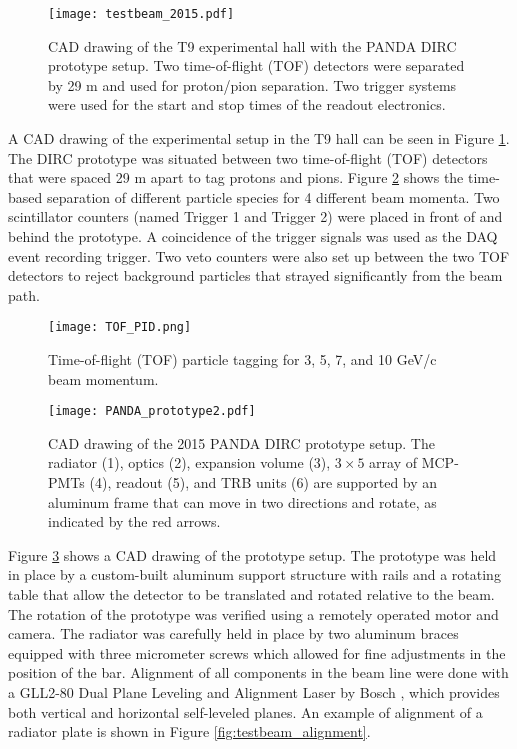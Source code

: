 \begin{figure}[!htb]
	\centering
	\texttt{[image: testbeam\_2015.pdf]}
	\caption{CAD drawing of the T9 experimental hall with the PANDA DIRC prototype setup. Two time-of-flight (TOF) detectors were separated by 29 m and used for proton/pion separation. Two trigger systems were used for the start and stop times of the readout electronics.}
	\label{fig:testbeam_2015}
\end{figure}

A CAD drawing of the experimental setup in the T9 hall can be seen in Figure \ref{fig:testbeam_2015}. The DIRC prototype was situated between two time-of-flight (TOF) detectors that were spaced 29 m apart to tag protons and pions. Figure \ref{fig:TOF_PID} shows the time-based separation of different particle species for 4 different beam momenta. Two scintillator counters (named Trigger 1 and Trigger 2) were placed in front of and behind the prototype. A coincidence of the trigger signals was used as the DAQ event recording trigger. Two veto counters were also set up between the two TOF detectors to reject background particles that strayed significantly from the beam path.

\begin{figure}[!htb]
	\centering
	\texttt{[image: TOF\_PID.png]}
	\caption{Time-of-flight (TOF) particle tagging for 3, 5, 7, and 10 GeV/c beam momentum.}
	\label{fig:TOF_PID}
\end{figure}

\begin{figure}[!htb]
	\centering
	\texttt{[image: PANDA\_prototype2.pdf]}
	\caption{CAD drawing of the 2015 PANDA DIRC prototype setup. The radiator (1), optics (2), expansion volume (3), $3\times5$ array of MCP-PMTs (4), readout (5), and TRB units (6) are supported by an aluminum frame that can move in two directions and rotate, as indicated by the red arrows.}
	\label{fig:PANDA_prototype}
\end{figure}

Figure \ref{fig:PANDA_prototype} shows a CAD drawing of the prototype setup. The prototype was held in place by a custom-built aluminum support structure with rails and a rotating table that allow the detector to be translated and rotated relative to the beam. The rotation of the prototype was verified using a remotely operated motor and camera. The radiator was carefully held in place by two aluminum braces equipped with three micrometer screws which allowed for fine adjustments in the position of the bar. Alignment of all components in the beam line were done with a GLL2-80 Dual Plane Leveling and Alignment Laser by Bosch \cite{BoschLaser}, which provides both vertical and horizontal self-leveled planes. An example of alignment of a radiator plate is shown in Figure \ref{fig:testbeam_alignment}. 

